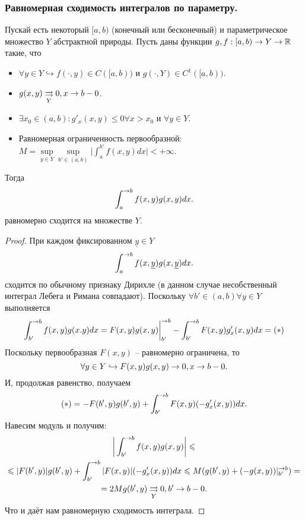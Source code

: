 \subsubsection{Равномерная сходимость интегралов по параметру.}
\begin{theorem}
    Пускай есть некоторый $[a, b)$ (конечный или бесконечный) и параметрическое множество $Y$ абстрактной природы.
    Пусть даны функции $g, f: [a, b) \to Y \rightarrow \mathbb{R}$ такие, что
    \begin{itemize}
        \item $\forall y \in Y \hookrightarrow f(\cdot, y) \in C([a, b))$ и $g(\cdot, Y) \in C^1([a, b))$.
        \item $g(x, y) \underset{Y}{\rightrightarrows} 0, x \rightarrow b - 0$.
        \item $\exists x_0 \in (a, b): g'_x(x, y) \leq 0 \forall x > x_0$ и $\forall y \in Y$.
        \item Равномерная ограниченность первообразной: $M = \sup\limits_{y \in Y} \sup\limits_{b' \in (a, b)} \biggr|\int_a^{b'}f(x, y)dx\biggr| < +\infty$.
    \end{itemize}
    Тогда \[
              \int_a^{\rightarrow b} f(x, y)g(x, y)dx.
    \]
    равномерно сходится на множестве $Y$.
\end{theorem}
\begin{proof}
    При каждом фиксированном $\underline{y} \in Y$
    \[
        \int_a^{\rightarrow b}f(x, \underline{y})g(x, \underline{y})dx.
    \]
    сходится по обычному признаку Дирихле (в данном случае несобственный интеграл Лебега и Римана совпадают).
    Поскольку $\forall b' \in (a, b) \forall y \in Y$ выполняется
    \[
        \int_{b'}^{\rightarrow b} f(x, y)g(x. y)dx = F(x, y)g(x, y)\biggr|_{b'}^{\rightarrow b} - \int_{b'}^{\rightarrow b}F(x, y)g'_x(x, y)dx = (*)
    \]
    Поскольку первообразная $F(x, y)$ -- равномерно ограничена, то
    \[
        \forall y \in Y \hookrightarrow F(x, y)g(x, y) \rightarrow 0, x \rightarrow b - 0.
    \]
    И, продолжая равенство, получаем
    \[
        (*) = -F(b', y)g(b', y) + \int_{b'}^{\rightarrow b} F(x, y)(-g'_x(x, y))dx.
    \]
    Навесим модуль и получим:
    \begin{multline*}
        \biggr|\int_{b'}^{\rightarrow b} f(x, y)g(x, y) \biggr| \leqslant \\ \leqslant
        |F(b', y)|g(b', y) + \int_{b'}^{\rightarrow b}  |F(x, y)|(-g'_x(x, y))dx \leqslant M(g(b', y) + (-g(x, y))|^{\rightarrow b}_{b'}) = \\ = 2M g(b', y) \underset{Y}{\rightrightarrows} 0, b' \rightarrow b - 0.
    \end{multline*}
    Что и даёт нам равномерную сходимость интеграла.
\end{proof}
